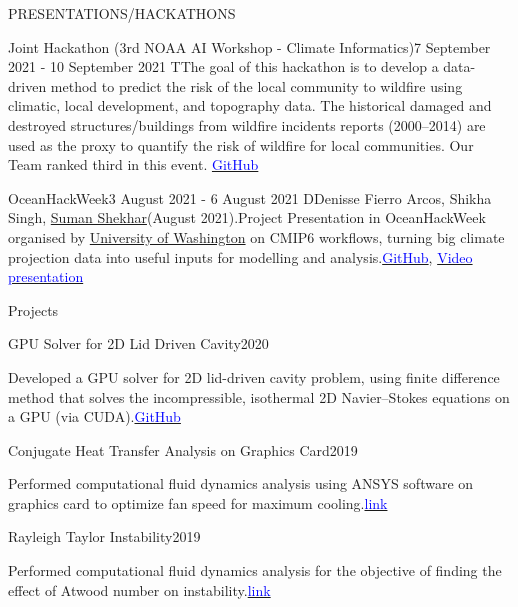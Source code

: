 \documentclass{resume} %
\begin{document}
\begin{rSection}{PRESENTATIONS/HACKATHONS}
\begin{rSubsection}{Joint Hackathon (3rd NOAA AI Workshop - Climate Informatics)}{7 September 2021 - 10 September 2021}{}
TThe goal of this hackathon is to develop a data-driven method to predict the risk of the local community to wildfire using climatic, local development, and topography data. The historical damaged and destroyed structures/buildings from wildfire incidents reports (2000–2014) are used as the proxy to quantify the risk of wildfire for local communities. Our Team ranked third in this event. \href{https://github.com/climate-informatics/hackathon-2021/blob/main/wildfire_risk/README.md}{\textcolor{blue}{GitHub}}
\end{rSubsection}

\begin{rSubsection}{OceanHackWeek}{3 August 2021 - 6 August 2021}{}
DDenisse Fierro Arcos, Shikha Singh, \underline{Suman Shekhar}(August 2021).Project Presentation in OceanHackWeek organised by \underline{University of Washington}  on CMIP6 workflows, turning big climate projection data into useful inputs for modelling and analysis.\href{https://github.com/oceanhackweek/ohw21-proj-cmip-ard}{\textcolor{blue}{GitHub}}, \href{https://youtu.be/Y5e50p39mnQ}{\textcolor{blue}{Video presentation}}  
\end{rSubsection}

\end{rSection}
\begin{rSection}{Projects}
\begin{rSubsection}{GPU Solver for 2D Lid Driven Cavity}{2020}{}
\item Developed a GPU solver for 2D lid-driven cavity problem, using finite difference method that solves the incompressible, isothermal 2D Navier–Stokes equations on a GPU (via CUDA).\href{https://github.com/Sumanshekhar17/3rd-year-project}{\textcolor{blue}{GitHub}}
\end{rSubsection}
\begin{rSubsection}{Conjugate Heat Transfer Analysis on Graphics Card}{2019}{}
\item Performed computational fluid dynamics analysis using ANSYS software on graphics card to optimize fan speed for maximum cooling.\href{https://skill-lync.com/student-projects/conjugate-heat-transfer-analysis-on-a-graphics-card-62}{\textcolor{blue}{link}}
\end{rSubsection}

\begin{rSubsection}{Rayleigh Taylor Instability}{2019}{}
\item Performed computational fluid dynamics analysis for the objective of finding the effect of Atwood number on instability.\href{https://skill-lync.com/student-projects/rayleigh-taylor-instability-challenge-35}{\textcolor{blue}{link}}
\end{rSubsection}

\end{rSection}
\end{document}
